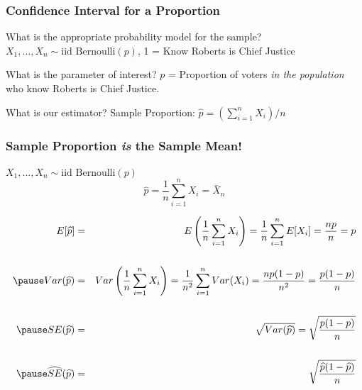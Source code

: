\documentclass{beamer}
\begin{document}
\begin{frame}
\frametitle{Confidence Interval for a Proportion}
	\begin{block}{What is the appropriate probability model for the sample?} 
$X_1, \hdots, X_n \sim \mbox{iid Bernoulli}(p)$, 1 = Know Roberts is Chief Justice
\end{block}


	\begin{block}{What is the parameter of interest?}
$p$ = Proportion of voters \emph{in the population} who know Roberts is Chief Justice.
\end{block}



\begin{block}{What is our estimator?} 
Sample Proportion: $\widehat{p} = (\sum_{i=1}^n X_i)/n$
\end{block}
\end{frame}

\begin{frame}
\frametitle{Sample Proportion \emph{is} the Sample Mean!}
\small
$X_1, \hdots, X_n \sim \mbox{iid Bernoulli}(p)$
		$$\widehat{p} = \frac{1}{n} \sum_{i=1}^n X_i = \bar{X}_n$$

\pause


	\begin{eqnarray*}
		E[\widehat{p}] &=&  E\left(\frac{1}{n}\sum_{i=1}^n X_i\right) =  \frac{1}{n} \sum_{i=1}^n E[X_i] =   \frac{np}{n} =  p\\ \\ \pause
		Var(\widehat{p}) &=&  Var\left(\frac{1}{n}\sum_{i=1}^n X_i\right) = \frac{1}{n^2} \sum_{i=1}^n Var(X_i) = \frac{n p(1-p)}{n^2} =  \frac{p(1-p)}{n} \\ \\  \pause
		SE(\widehat{p}) &=&  \sqrt{Var(\widehat{p})} =  \sqrt{\frac{p(1-p)}{n}} \\ \\ \pause
		\widehat{SE}(\widehat{p}) &=&  \sqrt{\frac{\widehat{p}(1-\widehat{p})}{n}}
	\end{eqnarray*}

\end{frame}
\end{document}
